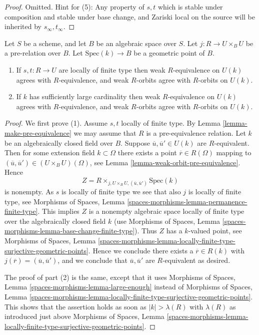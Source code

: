 \begin{proof}
Omitted. Hint for (5): Any property of $s, t$ which is stable under composition
and stable under base change, and Zariski local on the source
will be inherited by $s_\infty, t_\infty$.
\end{proof}

\begin{lemma}
\label{lemma-geometric-orbits}
Let $S$ be a scheme, and let $B$ be an algebraic space over $S$.
Let $j : R \to U \times_B U$ be a pre-relation over $B$.
Let $\text{Spec}(k) \to B$ be a geometric point of $B$.
\begin{enumerate}
\item If $s, t : R \to U$ are locally of finite type
then weak $R$-equivalence on $U(k)$ agrees with $R$-equivalence, and
weak $R$-orbits agree with $R$-orbits on $U(k)$.
\item If $k$ has sufficiently large cardinality then weak $R$-equivalence
on $U(k)$ agrees with $R$-equivalence, and weak $R$-orbits agree
with $R$-orbits on $U(k)$.
\end{enumerate}
\end{lemma}

\begin{proof}
We first prove (1). Assume $s, t$ locally of finite type. By
Lemma \ref{lemma-make-pre-equivalence}
we may assume that $R$ is a pre-equivalence relation.
Let $k$ be an algebraically closed field over $B$.
Suppose $\overline{u}, \overline{u}' \in U(k)$ are $R$-equivalent.
Then for some extension field $k \subset \Omega$ there exists
a point $\overline{r} \in R(\Omega)$ mapping to
$(\overline{u}, \overline{u}') \in (U \times_B U)(\Omega)$, see
Lemma \ref{lemma-weak-orbit-pre-equivalence}.
Hence
$$
Z = R \times_{j, U \times_B U, (\overline{u}, \overline{u}')} \text{Spec}(k)
$$
is nonempty. As $s$ is locally of finite type we see that
also $j$ is locally of finite type, see
Morphisms of Spaces, Lemma \ref{spaces-morphisms-lemma-permanence-finite-type}.
This implies $Z$ is a nonempty algebraic space locally of finite type
over the algebraically closed field $k$ (use
Morphisms of Spaces,
Lemma \ref{spaces-morphisms-lemma-base-change-finite-type}).
Thus $Z$ has a $k$-valued point, see
Morphisms of Spaces, Lemma
\ref{spaces-morphisms-lemma-locally-finite-type-surjective-geometric-points}.
Hence we conclude there exists a $\overline{r} \in R(k)$ with
$j(\overline{r}) = (\overline{u}, \overline{u}')$, and we conclude that
$\overline{u}, \overline{u}'$ are $R$-equivalent as desired.

\medskip\noindent
The proof of part (2) is the same, except that it uses
Morphisms of Spaces, Lemma
\ref{spaces-morphisms-lemma-large-enough}
instead of
Morphisms of Spaces, Lemma
\ref{spaces-morphisms-lemma-locally-finite-type-surjective-geometric-points}.
This shows that the assertion holds as soon as $|k| > \lambda(R)$ with
$\lambda(R)$ as introduced just above
Morphisms of Spaces, Lemma
\ref{spaces-morphisms-lemma-locally-finite-type-surjective-geometric-points}.
\end{proof}


